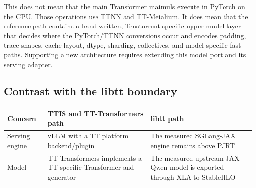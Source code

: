 \documentclass[
  10pt,
  american,
  10pt,
  letterpaper]{article}
\begin{document}
This does not mean that the main Transformer matmuls execute in PyTorch
on the CPU. Those operations use TTNN and TT-Metalium. It does mean that
the reference path contains a hand-written, Tenstorrent-specific upper
model layer that decides where the PyTorch/TTNN conversions occur and
encodes padding, trace shapes, cache layout, dtype, sharding,
collectives, and model-specific fast paths. Supporting a new
architecture requires extending this model port and its serving adapter.

\hypertarget{contrast-with-the-libtt-boundary}{%
\subsection{Contrast with the libtt
boundary}\label{contrast-with-the-libtt-boundary}}

\begin{longtable}[]{@{}lll@{}}
\toprule
\begin{minipage}[b]{0.30\columnwidth}\raggedright
Concern\strut
\end{minipage} & \begin{minipage}[b]{0.30\columnwidth}\raggedright
TTIS and TT-Transformers path\strut
\end{minipage} & \begin{minipage}[b]{0.30\columnwidth}\raggedright
libtt path\strut
\end{minipage}\tabularnewline
\midrule
\endhead
\begin{minipage}[t]{0.30\columnwidth}\raggedright
Serving engine\strut
\end{minipage} & \begin{minipage}[t]{0.30\columnwidth}\raggedright
vLLM with a TT platform backend/plugin\strut
\end{minipage} & \begin{minipage}[t]{0.30\columnwidth}\raggedright
The measured SGLang-JAX engine remains above PJRT\strut
\end{minipage}\tabularnewline
\begin{minipage}[t]{0.30\columnwidth}\raggedright
Model\strut
\end{minipage} & \begin{minipage}[t]{0.30\columnwidth}\raggedright
TT-Transformers implements a TT-specific Transformer and generator\strut
\end{minipage} & \begin{minipage}[t]{0.30\columnwidth}\raggedright
The measured upstream JAX Qwen model is exported through XLA to
StableHLO\strut

\end{minipage}
\end{longtable}
\end{document}
